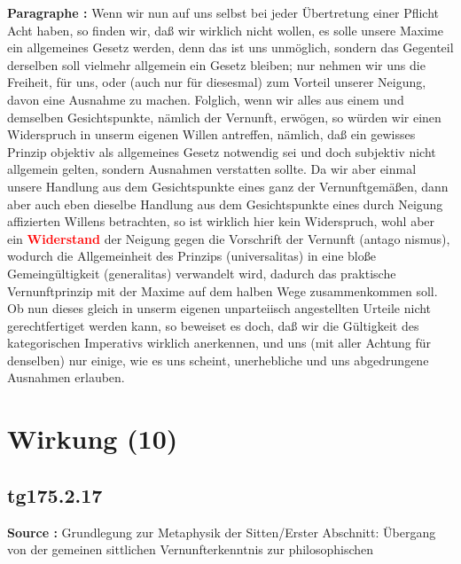 \documentclass[a4paper,12pt,twoside]{book}
\newcommand{\match}[1]{\textcolor{red}{\textbf{#1}}}
\newcommand{\unnumberedsection}[1]{
	\section*{#1}
	\addcontentsline{toc}{section}{#1}
	\markright{#1}
}
\begin{document}
	\noindent\textbf{Paragraphe : }Wenn wir nun auf uns selbst bei jeder Übertretung einer Pflicht Acht haben, so finden wir, daß wir wirklich nicht wollen, es solle unsere Maxime ein allgemeines Gesetz werden, denn das ist uns unmöglich, sondern das Gegenteil derselben soll vielmehr allgemein ein Gesetz bleiben; nur nehmen wir uns die Freiheit, für uns, oder (auch nur für diesesmal) zum Vorteil unserer Neigung, davon eine Ausnahme zu machen. Folglich, wenn wir alles aus einem und demselben Gesichtspunkte, nämlich der Vernunft, erwögen, so würden wir einen Widerspruch in unserm eigenen Willen antreffen, nämlich, daß ein gewisses Prinzip objektiv als allgemeines Gesetz notwendig sei und doch subjektiv nicht allgemein gelten, sondern Ausnahmen verstatten sollte. Da wir aber einmal unsere Handlung aus dem Gesichtspunkte eines ganz der Vernunftgemäßen, dann aber auch eben dieselbe Handlung aus dem Gesichtspunkte eines durch Neigung affizierten Willens betrachten, so ist wirklich hier kein Widerspruch, wohl aber ein \match{Widerstand} der Neigung gegen die Vorschrift der Vernunft (antago nismus), wodurch die Allgemeinheit des Prinzips (universalitas) in eine bloße Gemeingültigkeit (generalitas) verwandelt wird, dadurch das praktische Vernunftprinzip mit der Maxime auf dem halben Wege zusammenkommen soll. Ob nun dieses gleich in unserm eigenen unparteiisch angestellten Urteile nicht gerechtfertiget werden kann, so beweiset es doch, daß wir die  Gültigkeit des kategorischen Imperativs wirklich anerkennen, und uns (mit aller Achtung für denselben) nur einige, wie es uns scheint, unerhebliche und uns abgedrungene Ausnahmen erlauben. 
	
	\unnumberedsection{Wirkung (10)} 
	\subsection*{tg175.2.17} 
	\textbf{Source : }Grundlegung zur Metaphysik der Sitten/Erster Abschnitt: Übergang von der gemeinen sittlichen Vernunfterkenntnis zur philosophischen\\  
	
\end{document}

